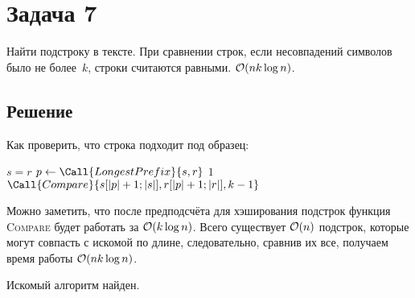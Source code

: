 \section{Задача 7}
Найти подстроку в тексте. При сравнении строк, если несовпадений символов было не более~$k$, строки считаются равными. $\mathcal{O}(nk \log n)$.

\subsection{Решение}
Как проверить, что строка подходит под образец:

\noindent
\begin{minipage}{\hsize}
\begin{algorithmic}
            \State \Return $s = r$
        \Else
            \State $p \gets \Call{LongestPrefix}{s, r}$
                \State \Return $1$
            \Else
                \State \Return $\Call{Compare}{s[|p| + 1; |s|], r[|p| + 1; |r|], k - 1}$
            \EndIf
        \EndIf
    \EndFunction
\end{algorithmic}
\end{minipage}

Можно заметить, что после предподсчёта для хэширования подстрок
функция \textsc{Compare} будет работать за $\mathcal{O}(k \log n)$.
Всего существует $\mathcal{O}(n)$ подстрок, которые могут совпасть с искомой по длине,
следовательно, сравнив их все, получаем время работы $\mathcal{O}(nk \log n)$.

Искомый алгоритм найден.
